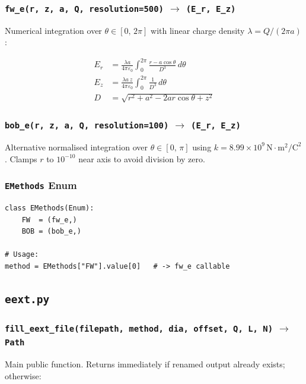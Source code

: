 \documentclass[11pt, a4paper]{article}
\begin{document}
\subsubsection*{\texttt{fw\_e(r, z, a, Q, resolution=500)} $\to$ \texttt{(E\_r, E\_z)}}

Numerical integration over $\theta \in [0,\,2\pi]$ with linear charge density
$\lambda = Q/(2\pi a)$:

\begin{align}
E_r &= \frac{\lambda a}{4\pi\varepsilon_0}
       \int_0^{2\pi} \frac{r - a\cos\theta}{D^3}\,d\theta \\[6pt]
E_z &= \frac{\lambda a\,z}{4\pi\varepsilon_0}
       \int_0^{2\pi} \frac{1}{D^3}\,d\theta \\[4pt]
D   &= \sqrt{r^2 + a^2 - 2ar\cos\theta + z^2}
\end{align}

\subsubsection*{\texttt{bob\_e(r, z, a, Q, resolution=100)} $\to$ \texttt{(E\_r, E\_z)}}

Alternative normalised integration over $\theta \in [0,\,\pi]$ using
$k = 8.99\times10^9\,\text{N}\cdot\text{m}^2/\text{C}^2$.
Clamps $r$ to $10^{-10}$ near axis to avoid division by zero.

\subsubsection*{\texttt{EMethods} Enum}
\begin{lstlisting}[style=python]
class EMethods(Enum):
    FW  = (fw_e,)
    BOB = (bob_e,)

# Usage:
method = EMethods["FW"].value[0]   # -> fw_e callable
\end{lstlisting}

\subsection{\texttt{eext.py}}

\subsubsection*{\texttt{fill\_eext\_file(filepath, method, dia, offset, Q, L, N)} $\to$ \texttt{Path}}

Main public function. Returns immediately if renamed output already exists; otherwise:
\end{document}
